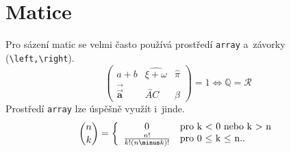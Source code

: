 \documentclass[twocolumn, a4paper, 11pt]{article}
\theoremstyle{definition}
\begin{document}
\section{Matice}
Pro sázení matic se velmi často používá prostředí \verb|array| a~závorky (\verb|\left,\right|).
\[ \left(\begin{array}{ccc}
a+b & \widehat{\xi + \omega} & \hat{\pi} \\
\overrightarrow{\vec{\mathbf{a}}} & \overleftrightarrow{AC} & \beta
\end{array} \right)  = 1  \iff \mathbb{Q} = \mathcal{R}\]
Prostředí \verb|array| lze úspěšně využít i~jinde.
\[ \binom{n}{k} = \left\{ \begin{array}{c l}
         0 & \mbox{pro k $<$ 0 nebo k $>$ n}\\
         \frac{n!}{k!(n \minus k)!} & \mbox{pro 0 $\leq$ k $\leq$ n.}.\end{array} \right. \]
         
\end{document}
